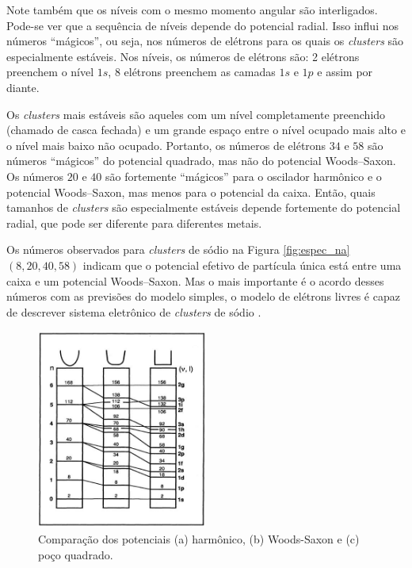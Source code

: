  Note também que os níveis com o mesmo momento angular são interligados. Pode-se ver que a sequência de níveis depende do potencial radial. Isso influi nos números “mágicos”, ou seja, nos números de elétrons para os quais os \textit{clusters} são especialmente estáveis. Nos níveis, os números de elétrons são: 2 elétrons preenchem o nível $1s$, 8 elétrons preenchem as camadas $1s$ e $1p$ e assim por diante.
 
 Os \textit{clusters} mais estáveis são aqueles com um nível completamente preenchido (chamado de casca fechada) e um grande espaço entre o nível ocupado mais alto e o nível mais baixo não ocupado. Portanto, os números de elétrons $34$ e $58$ são números “mágicos” do potencial quadrado, mas não do potencial Woods–Saxon. Os números $20$ e $40$ são fortemente “mágicos” para o oscilador harmônico e o potencial Woods–Saxon, mas menos para o potencial da caixa. Então, quais tamanhos de \textit{clusters} são especialmente estáveis depende fortemente do potencial radial, que pode ser diferente para diferentes metais.
 
Os números observados para 
\textit{clusters} de sódio na Figura \ref{fig:espec_na} $(8, 20, 40, 58)$ indicam que o potencial efetivo de partícula única está entre uma caixa e um potencial Woods–Saxon. Mas o mais importante é o acordo desses números com as previsões do modelo simples, o modelo de elétrons livres é capaz de descrever sistema eletrônico de \textit{clusters} de sódio \cite{livro_Clusters_Fullerenes}.

\begin{figure}
  \centering
  \includegraphics[width=0.5\textwidth]{images/clusters/pocos}
  \caption{Comparação dos potenciais (a) harmônico, (b) Woods-Saxon e (c) poço quadrado. \cite{Heer}}
  \label{fig:pocos}
\end{figure}

